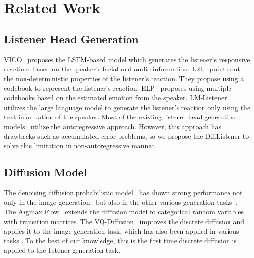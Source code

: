 \section{Related Work}
\subsection{Listener Head Generation}
VICO~\cite{zhou2022responsive} 
proposes the LSTM-based model which generates the listener's responsive reactions based on the speaker's facial and audio information.
L2L~\cite{ng2022learning} points out the non-deterministic properties of the listener's reaction. They propose using a codebook to represent the listener's reaction.
ELP~\cite{song2023emotional} proposes using multiple codebooks based on the estimated emotion from the speaker.
LM-Listener~\cite{ng2023can} utilizes the large language model to generate the listener's reaction only using the text information of the speaker. 
Most of the existing listener head generation models~\cite{ng2022learning, ng2023can, zhou2022responsive} utilize the autoregressive approach. However, this approach has drawbacks such as accumulated error problems, so we propose the DiffListener to solve this limitation in non-autoregressive manner.

\subsection{Diffusion Model}
The denoising diffusion probabilistic model~\cite{sohl2015deep} has shown strong performance not only in the image generation~\cite{ho2020denoising,ho2022cascaded,epstein2023diffusion}
but also in the other various generation tasks~\cite{kong2020diffwave,gong2022diffuseq, ho2022imagen}. 
The Argmax Flow~\cite{hoogeboom2021argmax} extends the diffusion model to categorical random variables with transition matrices. 
The VQ-Diffusion~\cite{gu2022vector} improves the discrete diffusion and applies it to the image generation task, which has also been applied in various tasks \cite{yang2023diffsound,li2023generalized,han2024clip}. To the best of our knowledge, this is the first time discrete diffusion is applied to the listener generation task.